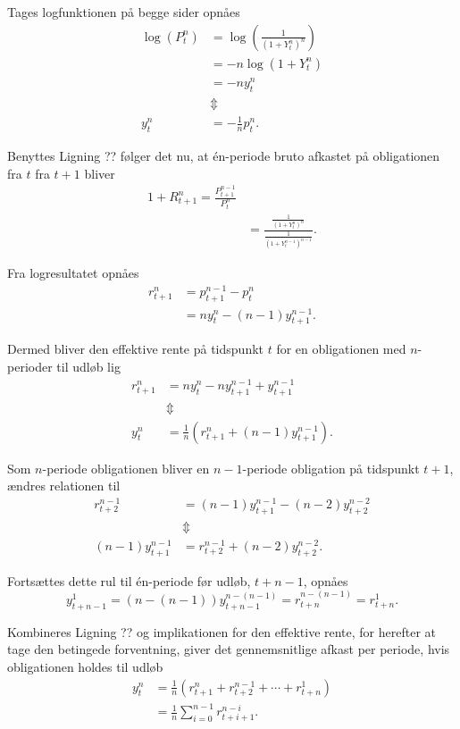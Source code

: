\documentclass[
  a4paper,
  oneside]{memoir}
\begin{document}
Tages logfunktionen på begge sider opnåes
\begin{align}
\log(P_t^n)&=\log(\frac{1}{(1+Y_t^n)^n})\\
&=-n\log(1+Y_t^n)\\
&=-n y_t^n\\
&\Updownarrow\\
y_t^n&=-\frac{1}{n}p_t^n.
\end{align}

Benyttes Ligning ?? følger det nu, at én-periode bruto afkastet på obligationen fra \(t\) fra \(t+1\) bliver
\begin{align}
1+R_{t+1}^n=\frac{P_{t+1}^{n-1}}{P_t^n}\\
&=\frac{\frac{1}{(1+Y_t^n)^n}}{\frac{1}{(1+Y_t^{n-1})^{n-1}}}.
\end{align}

Fra logresultatet opnåes
\begin{align}
r_{t+1}^n&=p_{t+1}^{n-1}-p_t^n\\
&=n y_t^n - (n-1) y_{t+1}^{n-1}.
\end{align}

Dermed bliver den effektive rente på tidspunkt \(t\) for en obligationen med \(n\)-perioder til udløb lig
\begin{align}
r_{t+1}^n&=n y_t^n - ny_{t+1}^{n-1}+y_{t+1}^{n-1}\\
&\Updownarrow\\
y_t^n &=\frac{1}{n}\left( r_{t+1}^n + (n-1) y_{t+1}^{n-1} \right).
\end{align}

Som \(n\)-periode obligationen bliver en \(n-1\)-periode obligation på tidspunkt \(t+1\), ændres relationen til
\begin{align}
r_{t+2}^{n-1}&=(n-1) y_{t+1}^{n-1} - (n-2) y_{t+2}^{n-2}\\
&\Updownarrow\\
(n-1) y_{t+1}^{n-1}&=r_{t+2}^{n-1} + (n-2) y_{t+2}^{n-2}.
\end{align}

Fortsættes dette rul til én-periode før udløb, \(t+n-1\), opnåes
\begin{equation}
y_{t+n-1}^{1}=(n-(n-1))y_{t+n-1}^{n-(n-1)}=r_{t+n}^{n-(n-1)}=r_{t+n}^1.
\end{equation}

Kombineres Ligning ?? og implikationen for den effektive rente, for herefter at tage den betingede forventning, giver det gennemsnitlige afkast per periode, hvis obligationen holdes til udløb
\begin{align}
y_t^n&=\frac{1}{n} (r_{t+1}^n + r_{t+2}^{n-1}+\cdots+r_{t+n}^1)\\
&=\frac{1}{n}\sum_{i=0}^{n-1} r_{t+i+1}^{n-i}.
\end{align}
\end{document}
